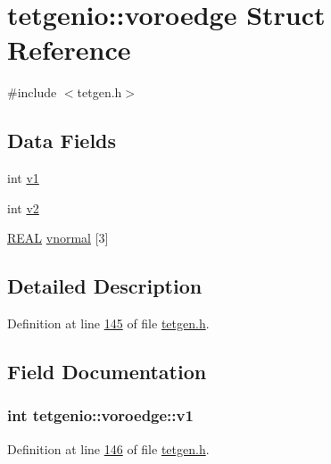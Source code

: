 \hypertarget{structtetgenio_1_1voroedge}{}\section{tetgenio\+:\+:voroedge Struct Reference}
\label{structtetgenio_1_1voroedge}


{\ttfamily \#include $<$tetgen.\+h$>$}

\subsection*{Data Fields}
\begin{DoxyCompactItemize}
\item 
int \hyperlink{structtetgenio_1_1voroedge_a2c18bda2392af5f81bc790a2c0ea3139}{v1}
\item 
int \hyperlink{structtetgenio_1_1voroedge_a19a27882ca68a89123965f7b08e05d55}{v2}
\item 
\hyperlink{tetgen_8h_a4b654506f18b8bfd61ad2a29a7e38c25}{R\+E\+AL} \hyperlink{structtetgenio_1_1voroedge_afea78ad75784a868068e6d86c21531a3}{vnormal} \mbox{[}3\mbox{]}
\end{DoxyCompactItemize}


\subsection{Detailed Description}


Definition at line \hyperlink{tetgen_8h_source_l00145}{145} of file \hyperlink{tetgen_8h_source}{tetgen.\+h}.



\subsection{Field Documentation}
\subsubsection[{\texorpdfstring{v1}{v1}}]{\setlength{\rightskip}{0pt plus 5cm}int tetgenio\+::voroedge\+::v1}\hypertarget{structtetgenio_1_1voroedge_a2c18bda2392af5f81bc790a2c0ea3139}{}\label{structtetgenio_1_1voroedge_a2c18bda2392af5f81bc790a2c0ea3139}


Definition at line \hyperlink{tetgen_8h_source_l00146}{146} of file \hyperlink{tetgen_8h_source}{tetgen.\+h}.

